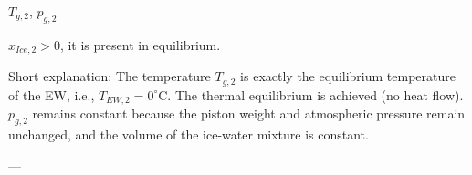 \( T_{g,2} \), \( p_{g,2} \)  

\( x_{Ice,2} > 0 \), it is present in equilibrium.  

Short explanation:  
The temperature \( T_{g,2} \) is exactly the equilibrium temperature of the EW, i.e., \( T_{EW,2} = 0^\circ \text{C} \). The thermal equilibrium is achieved (no heat flow). \( p_{g,2} \) remains constant because the piston weight and atmospheric pressure remain unchanged, and the volume of the ice-water mixture is constant.  

---